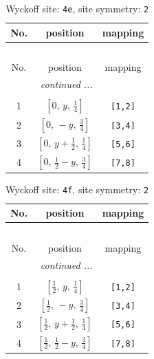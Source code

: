 \documentclass[fleqn,8pt]{jsarticle}
\begin{document}
\renewcommand{\arraystretch}{1.2}
\begin{longtable}{ccc}
\caption{Wyckoff site: {\tt 4e}, site symmetry: {\tt 2}}
 \\
 \hline \hline
No. & position & mapping \\ \hline \endfirsthead

\multicolumn{2}{l}{\tablename\ \thetable{}} \\
 \hline \hline
No. & position & mapping \\ \hline \endhead

 \hline \hline
\multicolumn{2}{r}{\footnotesize\it continued ...} \\ \endfoot

 \hline \hline
\multicolumn{2}{r}{} \\ \endlastfoot

1 & $\left[ 0,\, y,\, \frac{1}{4} \right]$ & {\tt [1,2]} \\ \hline
2 & $\left[ 0,\, - y,\, \frac{3}{4} \right]$ & {\tt [3,4]} \\ \hline
3 & $\left[ 0,\, y + \frac{1}{2},\, \frac{1}{4} \right]$ & {\tt [5,6]} \\ \hline
4 & $\left[ 0,\, \frac{1}{2} - y,\, \frac{3}{4} \right]$ & {\tt [7,8]} \\
\end{longtable}
\renewcommand{\arraystretch}{1.2}
\begin{longtable}{ccc}
\caption{Wyckoff site: {\tt 4f}, site symmetry: {\tt 2}}
 \\
 \hline \hline
No. & position & mapping \\ \hline \endfirsthead

\multicolumn{2}{l}{\tablename\ \thetable{}} \\
 \hline \hline
No. & position & mapping \\ \hline \endhead

 \hline \hline
\multicolumn{2}{r}{\footnotesize\it continued ...} \\ \endfoot

 \hline \hline
\multicolumn{2}{r}{} \\ \endlastfoot

1 & $\left[ \frac{1}{2},\, y,\, \frac{1}{4} \right]$ & {\tt [1,2]} \\ \hline
2 & $\left[ \frac{1}{2},\, - y,\, \frac{3}{4} \right]$ & {\tt [3,4]} \\ \hline
3 & $\left[ \frac{1}{2},\, y + \frac{1}{2},\, \frac{1}{4} \right]$ & {\tt [5,6]} \\ \hline
4 & $\left[ \frac{1}{2},\, \frac{1}{2} - y,\, \frac{3}{4} \right]$ & {\tt [7,8]} \\
\end{longtable}
\end{document}
